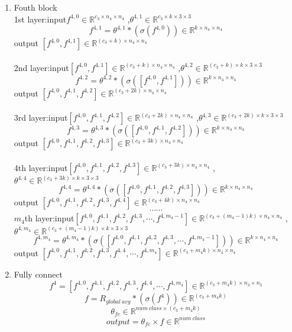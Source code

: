 \begin{enumerate}
\\ \hspace*{\fill} \\
\item Fouth block\\
1st layer:\quad input$f^{4,0}\in \mathbb{R}^{c_3\times n_4\times n_4}$ ,$\theta^{4,1} \in \mathbb{R}^{c_3\times k\times 3\times 3 }$
$$f^{4,1}=\theta^{4,1} \ast (\sigma(f^{4,0}))\in \mathbb{R}^{k\times n_4\times n_4}$$
\quad\quad\quad\quad\quad output $[f^{4,0},f^{4,1}] \in \mathbb{R}^{(c_3+k)\times n_4\times n_4}$
\\ \hspace*{\fill} \\
2nd layer:\quad input$[f^{4,0},f^{4,1}] \in \mathbb{R}^{(c_3+k)\times n_4\times n_4}$ ,$\theta^{4,2} \in \mathbb{R}^{(c_3+k)\times k\times 3\times 3}$
$$ f^{4,2}=\theta^{4,2} \ast (\sigma([f^{4,0},f^{4,1}]))\in \mathbb{R}^{k\times n_4\times n_4}$$
\quad\quad\quad\quad\quad output $[f^{4,0},f^{4,1}, f^{4,2}] \in \mathbb{R}^{(c_3+2k)\times n_4\times n_4}$
\\ \hspace*{\fill} \\
3rd layer:\quad input$[f^{4,0},f^{4,1},f^{4,2}] \in \mathbb{R}^{(c_3+2k)\times n_4\times n_4}$ ,$\theta^{4,3} \in \mathbb{R}^{(c_3+2k)\times k\times3\times 3}$
$$ f^{4,3}=\theta^{4,3} \ast (\sigma([f^{4,0},f^{4,1},f^{4,2}]))\in \mathbb{R}^{k\times n_4\times n_4}$$
\quad\quad\quad\quad\quad output $[f^{4,0},f^{4,1}, f^{4,2},f^{4,3}] \in \mathbb{R}^{(c_3+3k)\times n_4\times n_4}$
\\ \hspace*{\fill} \\
4th layer:\quad input$[f^{4,0},f^{4,1},f^{4,2},f^{4,3}] \in \mathbb{R}^{(c_3+3k)\times n_4\times n_4}$ ,$\theta^{4,4} \in \mathbb{R}^{(c_3+3k)\times k\times3\times 3 }$
$$ f^{4,4}=\theta^{4,4} \ast (\sigma([f^{4,0},f^{4,1},f^{4,2},f^{4,3}]))\in \mathbb{R}^{k\times n_4\times n_4}$$
\quad\quad\quad\quad\quad output $[f^{4,0},f^{4,1}, f^{4,2},f^{4,3},f^{4,4}] \in \mathbb{R}^{(c_3+4k)\times n_4\times n_4}$
$$\cdots\cdots$$
$m_4$th layer:\quad input$[f^{4,0},f^{4,1},f^{4,2},f^{4,3},\cdots,f^{4,m_4-1}] \in \mathbb{R}^{(c_3+(m_4-1)k)\times n_4\times n_4}$ ,$\theta^{4,m_4} \in \mathbb{R}^{(c_3+(m_4-1)k)\times k\times3\times 3 }$
$$ f^{4,m_4}=\theta^{4,m_4} \ast (\sigma([f^{4,0},f^{4,1},f^{4,2},f^{4,3},\cdots,f^{4,m_4-1}]))\in \mathbb{R}^{k\times n_4\times n_4}$$
\quad\quad\quad\quad\quad output $[f^{4,0},f^{4,1}, f^{4,2},f^{4,3},f^{4,4},\cdots,f^{4,m_4}] \in \mathbb{R}^{(c_3+m_4k)\times n_4\times n_4}$
\item Fully connect
$$f^4 = [f^{4,0},f^{4,1}, f^{4,2},f^{4,3},f^{4,4},\cdots,f^{4,m_4}] \in \mathbb{R}^{(c_3+m_4k)\times n_3\times n_3}$$
$$f = R_{global~avg} \ast(\sigma(f^4)) \in \mathbb{R}^{(c_3+m_4k)}$$
$$\theta_{fc} \in \mathbb{R}^{num~class\times (c_3+m_4k)}$$
$$output = \theta_{fc}\times f \in \mathbb{R}^{num~class}$$

\end{enumerate}

